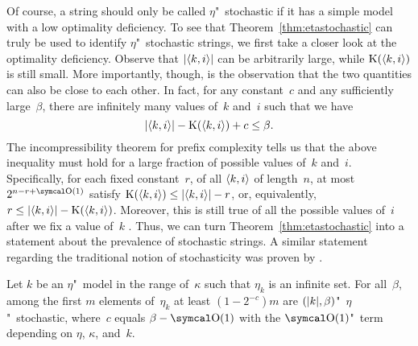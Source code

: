 Of course, a string should only be called $\eta$"~stochastic if it has a simple model with a low optimality deficiency.
To see that Theorem~\ref{thm:etastochastic} can truly be used to identify $\eta$"~stochastic strings, we first take a closer look at the optimality deficiency.
Observe that ${\lvert{\langle k, i\rangle}\rvert}$ can be arbitrarily large, while $\operatorname{K}({\langle k, i\rangle})$ is still small.
More importantly, though, is the observation that the two quantities can also be close to each other.
In fact, for any constant~$c$ and any sufficiently large~$\beta$, there are infinitely many values of~$k$ and~$i$ such that we have
\begin{equation*}
  {\lvert{\langle k, i\rangle}\rvert} - \operatorname{K}({\langle k, i\rangle}) + c \le \beta.
\end{equation*}
The incompressibility theorem for prefix complexity \parencite[Theorem~3.3.1(ii)]{li2008introduction} tells us that the above inequality must hold for a large fraction of possible values of~$k$ and~$i$.
Specifically, for each fixed constant~$r$, of all ${\langle k, i\rangle}$ of length~$n$, at most $2^{n - r + \bigO(1)}$ satisfy $\operatorname{K}({\langle k, i\rangle}) \le {\lvert{\langle k, i\rangle}\rvert} - r$, or, equivalently, $r \le {\lvert{\langle k, i\rangle}\rvert} - \operatorname{K}({\langle k, i\rangle})$.
Moreover, this is still true of all the possible values of~$i$ after we fix a value of~$k$ \parencite[Theorem~3.9.1]{li2008introduction}.
Thus, we can turn Theorem~\ref{thm:etastochastic} into a statement about the prevalence of stochastic strings.
A similar statement regarding the traditional notion of stochasticity was proven by \textcite[Theorem~4]{shen1983concept}.
\begin{corollary}
\label{cor:stochastic}%
  Let $k$ be an $\eta$"~model in the range of~$\kappa$ such that $\eta_k$ is an infinite set.
  For all~$\beta$, among the first $m$ elements of~$\eta_k$ at least $(1 - 2^{-c})m$ are $({\lvert k\rvert}, \beta)$"~$\eta$"~stochastic, where~$c$ equals $\beta - \bigO(1)$ with the $\bigO(1)$"~term depending on $\eta$, $\kappa$, and~$k$.
\end{corollary}

